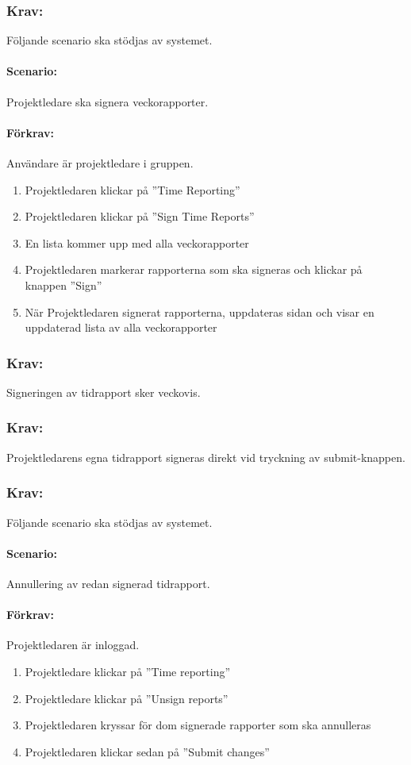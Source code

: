 \documentclass[paper=a4, fontsize=11pt,twoside]{article}
\begin{document}
\subsubsection{Krav:}
Följande scenario ska stödjas av systemet.
\paragraph{Scenario:}
Projektledare ska signera veckorapporter.
\paragraph{Förkrav:}
Användare är projektledare i gruppen.
\begin{enumerate}
\item Projektledaren klickar på ”Time Reporting”
\item Projektledaren klickar på ”Sign Time Reports”
\item En lista kommer upp med alla veckorapporter
\item Projektledaren markerar rapporterna som ska signeras och klickar på knappen ”Sign”
\item När Projektledaren signerat rapporterna, uppdateras sidan och visar en uppdaterad lista av alla veckorapporter
\end{enumerate}

\subsubsection{Krav:}
Signeringen av tidrapport sker veckovis.

\subsubsection{Krav:}
Projektledarens egna tidrapport signeras direkt vid tryckning av submit-knappen.

\subsubsection{Krav:}
Följande scenario ska stödjas av systemet.
\paragraph{Scenario:} Annullering av redan signerad tidrapport.
\paragraph{Förkrav:} Projektledaren är inloggad.
\begin{enumerate}
\item Projektledare klickar på ”Time reporting”
\item Projektledare klickar på ”Unsign reports”
\item Projektledaren kryssar för dom signerade rapporter som ska annulleras
\item Projektledaren klickar sedan på ”Submit changes”
\end{enumerate}
\end{document}
